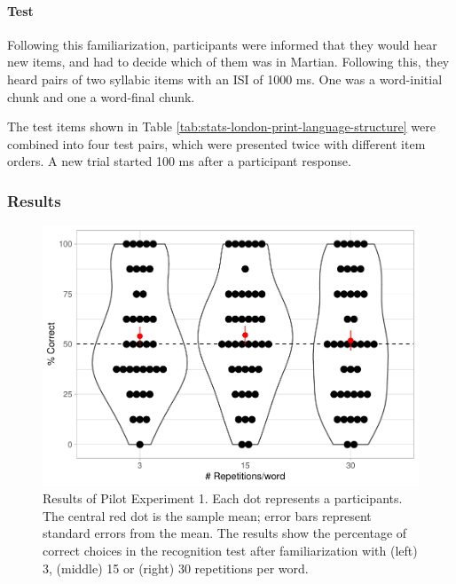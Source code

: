 \documentclass[
]{article}
\begin{document}
\hypertarget{test}{%
\paragraph{Test}\label{test}}

Following this familiarization, participants were informed that they
would hear new items, and had to decide which of them was in Martian.
Following this, they heard pairs of two syllabic items with an ISI of
1000 ms. One was a word-initial chunk and one a word-final chunk.

The test items shown in Table
\ref{tab:stats-london-print-language-structure} were combined into four
test pairs, which were presented twice with different item orders. A new
trial started 100 ms after a participant response.

\hypertarget{results-1}{%
\subsubsection{Results}\label{results-1}}

\begin{figure}

{\centering \includegraphics[width=0.8\linewidth]{segmentation_recall_combined_for_revision_files/figure-latex/bcn-plot-stats-1} 

}

\caption{Results of Pilot Experiment 1. Each dot represents a participants. The central red dot is the sample mean; error bars represent standard errors from the mean. The results show the percentage of correct choices in the recognition test after familiarization with (left) 3, (middle) 15  or (right) 30 repetitions per word.}\label{fig:bcn-plot-stats}
\end{figure}
\end{document}
